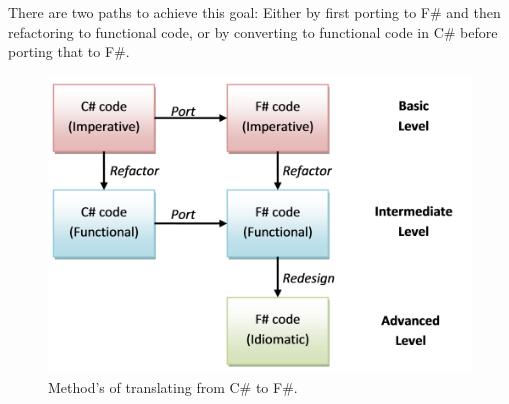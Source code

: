 \documentclass[12pt, a4paper]{article}
\begin{document}
There are two paths to achieve this goal: Either by first porting to F\# and then refactoring to functional code, or by converting to functional code in C\# before porting that to F\#.

\begin{figure}[!h]
    \includegraphics[scale=0.6]{image01}
    \centering
    \caption{Method's of translating from C\# to F\#.}
\end{figure}


\newpage
\end{document}
